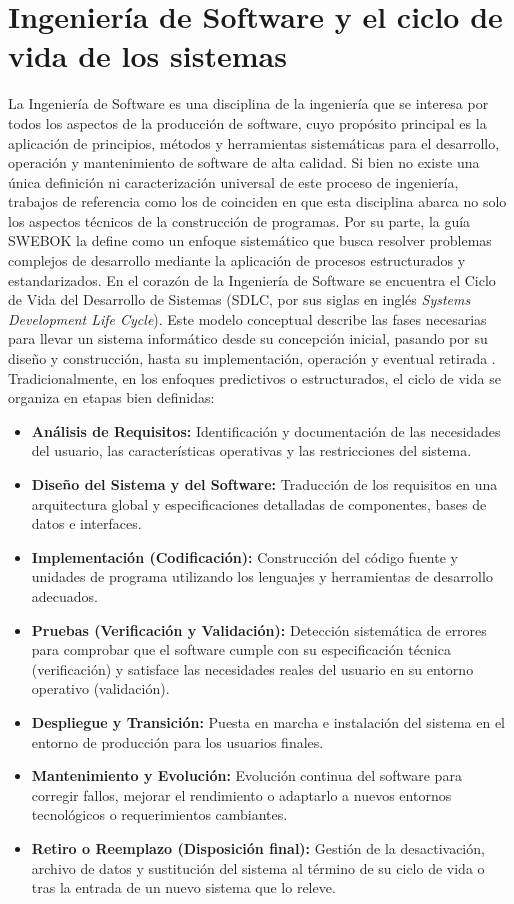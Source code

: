 \documentclass[12pt, letterpaper, oneside]{book}
\begin{document}
\section{Ingeniería de Software y el ciclo de vida de los sistemas} 
La Ingeniería de Software es una disciplina de la ingeniería que
se interesa por todos los aspectos de la producción de software\cite{sommerville2011software}, cuyo propósito principal es la aplicación de principios, métodos y herramientas sistemáticas para el desarrollo, operación y mantenimiento de software de alta calidad. Si bien no existe una única definición ni caracterización universal de este proceso de ingeniería, trabajos de referencia como los de \cite{Sommerville2015-px,swebok2024} coinciden en que esta disciplina abarca no solo los aspectos técnicos de la construcción de programas. Por su parte, la guía SWEBOK \cite{swebok2024} la define como un enfoque sistemático que busca resolver problemas complejos de desarrollo mediante la aplicación de procesos estructurados y estandarizados. En el corazón de la Ingeniería de Software se encuentra el Ciclo de Vida del Desarrollo de Sistemas (SDLC, por sus siglas en inglés \textit{Systems Development Life Cycle}). Este modelo conceptual describe las fases necesarias para llevar un sistema informático desde su concepción inicial, pasando por su diseño y construcción, hasta su implementación, operación y eventual retirada \cite{swebok2024}. Tradicionalmente, en los enfoques predictivos o estructurados, el ciclo de vida se organiza en etapas bien definidas: 
\begin{itemize} 
	\item \textbf{Análisis de Requisitos:} Identificación y documentación de las necesidades del usuario, las características operativas y las restricciones del sistema. 
	\item \textbf{Diseño del Sistema y del Software:} Traducción de los requisitos en una arquitectura global y especificaciones detalladas de componentes, bases de datos e interfaces. 
	\item \textbf{Implementación (Codificación):} Construcción del código fuente y unidades de programa utilizando los lenguajes y herramientas de desarrollo adecuados. 
	\item \textbf{Pruebas (Verificación y Validación):} Detección sistemática de errores para comprobar que el software cumple con su especificación técnica (verificación) y satisface las necesidades reales del usuario en su entorno operativo (validación). 
	\item \textbf{Despliegue y Transición:} Puesta en marcha e instalación del sistema en el entorno de producción para los usuarios finales. 
	\item \textbf{Mantenimiento y Evolución:} Evolución continua del software para corregir fallos, mejorar el rendimiento o adaptarlo a nuevos entornos tecnológicos o requerimientos cambiantes. 
	\item \textbf{Retiro o Reemplazo (Disposición final):} Gestión de la desactivación, archivo de datos y sustitución del sistema al término de su ciclo de vida o tras la entrada de un nuevo sistema que lo releve. 
\end{itemize} 
\end{document}
